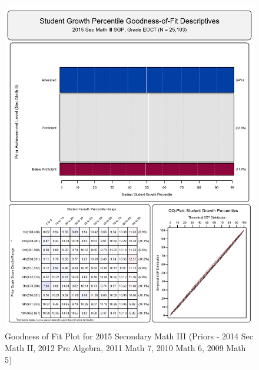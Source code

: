 \documentclass[12pt]{article}
\begin{document}
\begin{figure}[htbp]
\centering
\includegraphics{../img/Goodness_of_Fit/SEC_MATH_III.2015/2015_SEC_MATH_III_EOCT;2014_SEC_MATH_II_EOCT;2012_PRE_ALGEBRA_EOCT;2011_MATH_7;2010_MATH_6;2009_MATH_5.png}
\caption{Goodness of Fit Plot for 2015 Secondary Math III (Priors - 2014
Sec Math II, 2012 Pre Algebra, 2011 Math 7, 2010 Math 6, 2009 Math 5)}
\end{figure}
\end{document}
